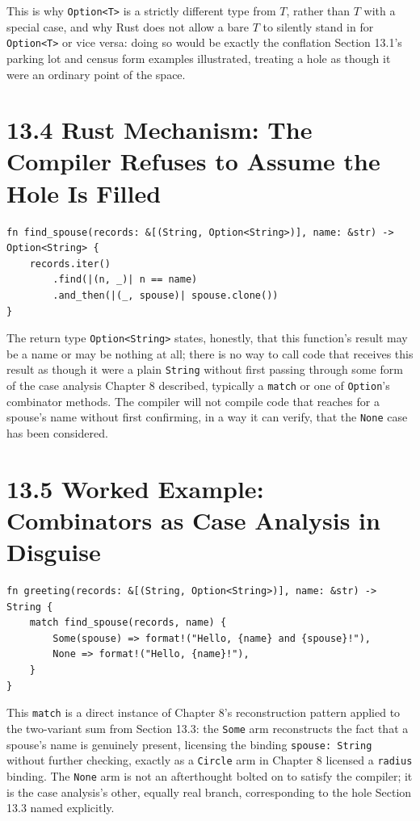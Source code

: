 \documentclass[11pt]{book}
\begin{document}
This is why \texttt{Option<T>} is a strictly different type from $T$, rather than $T$ with a special case, and why Rust does not allow a bare $T$ to silently stand in for \texttt{Option<T>} or vice versa: doing so would be exactly the conflation Section 13.1's parking lot and census form examples illustrated, treating a hole as though it were an ordinary point of the space.

\section*{13.4 Rust Mechanism: The Compiler Refuses to Assume the Hole Is Filled}

\begin{lstlisting}
fn find_spouse(records: &[(String, Option<String>)], name: &str) -> Option<String> {
    records.iter()
        .find(|(n, _)| n == name)
        .and_then(|(_, spouse)| spouse.clone())
}
\end{lstlisting}

The return type \texttt{Option<String>} states, honestly, that this function's result may be a name or may be nothing at all; there is no way to call code that receives this result as though it were a plain \texttt{String} without first passing through some form of the case analysis Chapter 8 described, typically a \texttt{match} or one of \texttt{Option}'s combinator methods. The compiler will not compile code that reaches for a spouse's name without first confirming, in a way it can verify, that the \texttt{None} case has been considered.

\section*{13.5 Worked Example: Combinators as Case Analysis in Disguise}

\begin{lstlisting}
fn greeting(records: &[(String, Option<String>)], name: &str) -> String {
    match find_spouse(records, name) {
        Some(spouse) => format!("Hello, {name} and {spouse}!"),
        None => format!("Hello, {name}!"),
    }
}
\end{lstlisting}

This \texttt{match} is a direct instance of Chapter 8's reconstruction pattern applied to the two-variant sum from Section 13.3: the \texttt{Some} arm reconstructs the fact that a spouse's name is genuinely present, licensing the binding \texttt{spouse: String} without further checking, exactly as a \texttt{Circle} arm in Chapter 8 licensed a \texttt{radius} binding. The \texttt{None} arm is not an afterthought bolted on to satisfy the compiler; it is the case analysis's other, equally real branch, corresponding to the hole Section 13.3 named explicitly.
\end{document}
